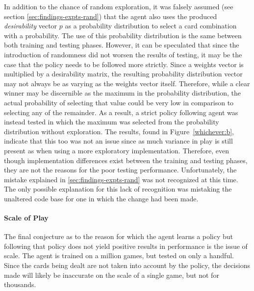 In addition to the chance of random exploration,
it was falsely assumed (see section \ref{sec:findings-expts-rand}) that
the agent also uses the produced \textit{desirability} vector $p$
as a probability distribution to select a card combination with a probability.
%
The use of this probability distribution is the same between both training 
and testing phases.
%
However,
it can be speculated that since the introduction of randomness did not worsen
the results of testing,
it may be the case that the policy needs to be followed more strictly.
%
Since a weights vector is multiplied by a desirability matrix,
the resulting probability distribution vector may not always be as
varying as the weights vector itself.
%
Therefore,
while a clear winner may be discernible as the maximum in the probability
distribution,
the actual probability of selecting that value could be very low in comparison
to selecting any of the remainder.
%
As a result,
a strict policy following agent was instead tested in which the maximum was
selected from the probability distribution without exploration.
%
The results,
found in Figure~\ref{whichever:b},
indicate that this too was not an issue
since as much variance in play is still present as when using a more exploratory
implementation.
%
Therefore,
even though implementation differences exist between the training and testing
phases,
they are not the reasons for the poor testing performance.
%
Unfortunately,
the mistake explained in \ref{sec:findings-expts-rand} was not recognized
at this time.
%
The only possible explanation for this lack of recognition was mistaking the
unaltered code base for one in which the change had been made.


\paragraph*{Scale of Play}

The final conjecture as to the reason for which the agent learns a policy
but following that policy does not yield positive results in performance
is the issue of scale.
%
The agent is trained on a million games,
but tested on only a handful.
%
Since the cards being dealt are not taken into account by the policy,
the decisions made will likely be inaccurate on the scale of a single game,
but not for thousands.




